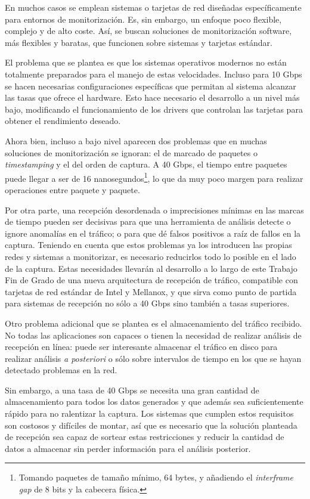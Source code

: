 \documentclass[twoside, 12pt]{epstfg}
\begin{document}
En muchos casos se emplean sistemas o tarjetas de red diseñadas específicamente para entornos de monitorización. Es, sin embargo, un enfoque poco flexible, complejo y de alto coste. Así,  se buscan soluciones de monitorización software, más flexibles y baratas, que funcionen sobre sistemas y tarjetas estándar.

El problema que se plantea es que los sistemas operativos modernos no están totalmente preparados para el manejo de estas velocidades. Incluso para 10 Gbps se hacen necesarias configuraciones específicas \cite{leitao2009tuning} que permitan al sistema alcanzar las tasas que ofrece el hardware. Esto hace necesario el desarrollo a un nivel más bajo, modificando el funcionamiento de los \glspl{driver} que controlan las tarjetas para obtener el rendimiento deseado.

Ahora bien, incluso a bajo nivel aparecen dos problemas que en muchas soluciones de monitorización se ignoran:  el de marcado de paquetes o \textit{timestamping} y el del orden de captura. A 40 Gbps, el tiempo entre paquetes puede llegar a ser de 16 nanosegundos\footnote{Tomando paquetes de tamaño mínimo, 64 bytes, y añadiendo el \textit{interframe gap} de 8 bits y la cabecera física.}, lo que da muy poco margen para realizar operaciones entre paquete y paquete.

Por otra parte, una recepción desordenada o imprecisiones mínimas en las marcas de tiempo pueden ser decisivas para que una herramienta de análisis detecte o ignore anomalías en el tráfico; o para que dé falsos positivos a raíz de fallos en la captura. Teniendo en cuenta que estos problemas ya los introducen las propias redes y sistemas a monitorizar, es necesario reducirlos todo lo posible en el lado de la captura. Estas necesidades llevarán al desarrollo a lo largo de este Trabajo Fin de Grado de una nueva arquitectura de recepción de tráfico, compatible con tarjetas de red estándar de Intel y Mellanox, y que sirva como punto de partida para sistemas de recepción no sólo a 40 Gbps sino también a tasas superiores.

Otro problema adicional que se plantea es el almacenamiento del tráfico recibido. No todas las aplicaciones son capaces o tienen la necesidad de realizar análisis de recepción en línea: puede ser interesante almacenar el tráfico en disco para realizar análisis \textit{a posteriori} o sólo sobre intervalos de tiempo en los que se hayan detectado problemas en la red.

Sin embargo, a una tasa de 40 Gbps se necesita una gran cantidad de almacenamiento para todos los datos generados y que además sea suficientemente rápido para no ralentizar la captura. Los sistemas que cumplen estos requisitos son costosos y difíciles de montar, así que es necesario que la solución planteada de recepción sea capaz de sortear estas restricciones y reducir la cantidad de datos a almacenar sin perder información para el análisis posterior.
\end{document}
